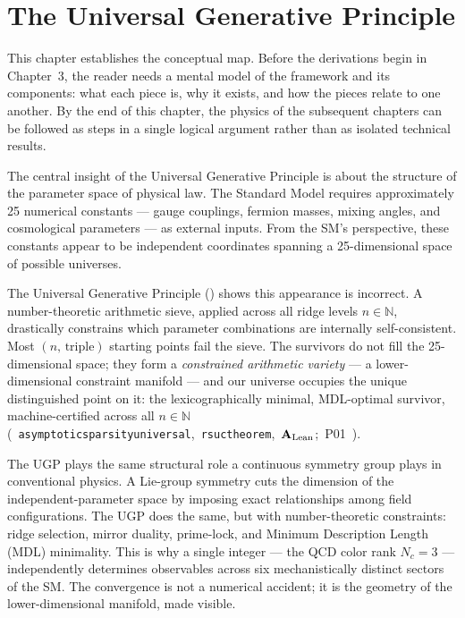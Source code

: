 \documentclass[11pt,openany]{book}
\theoremstyle{remark}
\newcommand{\UGP}{\text{UGP}}
\newcommand{\lean}[1]{%
  \penalty-100
  \begingroup\def\_{\textunderscore\allowbreak}\texttt{#1}\endgroup}
\newcommand{\Nc}{N_c}
\newcommand{\CatAL}{\ensuremath{\textbf{A}_{\rm Lean}}}
\begin{document}
\section{The Universal Generative Principle}
\label{sec:ugp_what}

This chapter establishes the conceptual map.
Before the derivations begin in Chapter~3, the reader needs a mental model of the
framework and its components: what each piece is, why it exists, and how the pieces
relate to one another.
By the end of this chapter, the physics of the subsequent chapters can be followed
as steps in a single logical argument rather than as isolated technical results.

The central insight of the Universal Generative Principle is about the structure of the
parameter space of physical law.
The Standard Model requires approximately 25 numerical constants --- gauge couplings,
fermion masses, mixing angles, and cosmological parameters --- as external inputs.
From the SM's perspective, these constants appear to be independent coordinates spanning
a 25-dimensional space of possible universes.

The Universal Generative Principle (\UGP) shows this appearance is incorrect.
A number-theoretic arithmetic sieve, applied across all ridge levels $n \in \mathbb{N}$,
drastically constrains which parameter combinations are internally self-consistent.
Most $(n,\,\text{triple})$ starting points fail the sieve.
The survivors do not fill the 25-dimensional space; they form a \emph{constrained
arithmetic variety} --- a lower-dimensional constraint manifold --- and our universe
occupies the unique distinguished point on it: the lexicographically minimal,
MDL-optimal survivor, machine-certified across all $n \in \mathbb{N}$
\mbox{(\lean{asymptotic\_sparsity\_universal}, \lean{rsuc\_theorem}, \CatAL; P01 \cite{SpivackSM})}.

The UGP plays the same structural role a continuous symmetry group plays in conventional
physics.
A Lie-group symmetry cuts the dimension of the independent-parameter space by imposing
exact relationships among field configurations.
The UGP does the same, but with number-theoretic constraints: ridge selection, mirror
duality, prime-lock, and Minimum Description Length (MDL) minimality.
This is why a single integer --- the QCD color rank $\Nc = 3$ --- independently
determines observables across six mechanistically distinct sectors of the SM.
The convergence is not a numerical accident; it is the geometry of the lower-dimensional
manifold, made visible.
\end{document}
